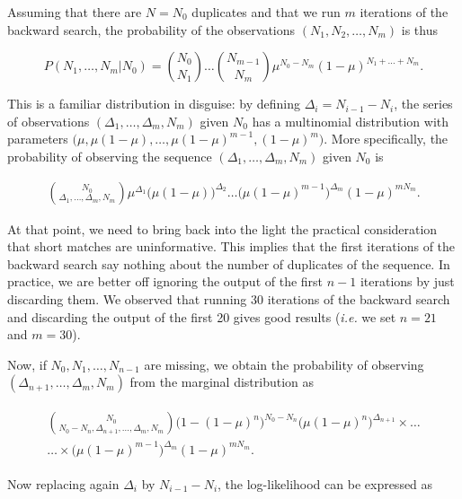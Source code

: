 \documentclass{article}
\begin{document}
Assuming that there are $N = N_0$ duplicates and that we run $m$
iterations of the backward search, the probability of the observations
$(N_1, N_2, \ldots, N_m)$ is thus

\begin{equation*}
P(N_1, \ldots, N_m|N_0) = 
{N_0 \choose N_1 } \ldots {N_{m-1} \choose N_m }
\mu^{N_0-N_m}(1-\mu)^{N_1+\ldots+N_m}.
\end{equation*}

This is a familiar distribution in disguise: by defining $\Delta_i =
N_{i-1} - N_i$, the series of observations $(\Delta_1, \ldots, \Delta_m,
N_m)$ given $N_0$ has a multinomial distribution with parameters
$\big(\mu, \mu(1-\mu), \ldots, \mu(1-\mu)^{m-1}, (1-\mu)^m\big)$. More
specifically, the probability of observing the sequence $(\Delta_1,
\ldots, \Delta_m, N_m)$ given $N_0$ is

\begin{align*}
{N_0 \choose \Delta_1, \ldots, \Delta_m, N_m}
\mu^{\Delta_1}\big(\mu(1-\mu)\big)^{\Delta_2}
\ldots \big(\mu(1-\mu)^{m-1}\big)^{\Delta_m}(1-\mu)^{mN_m}.
\end{align*}

At that point, we need to bring back into the light the practical
consideration that short matches are uninformative. This implies that the
first iterations of the backward search say nothing about the number of
duplicates of the sequence. In practice, we are better off ignoring the
output of the first $n-1$ iterations by just discarding them. We observed
that running 30 iterations of the backward search and discarding the
output of the first 20 gives good results (\textit{i.e.} we set $n = 21$
and $m=30$).

Now, if $N_0, N_1, \ldots, N_{n-1}$ are missing, we obtain the probability
of observing $(\Delta_{n+1}, \ldots, \Delta_m, N_m)$ from the marginal
distribution as

\begin{align*}
\begin{split}
{N_0 \choose N_0-N_n, \Delta_{n+1}, \ldots, \Delta_m, N_m}
\big(1-(1-\mu)^n\big)^{N_0-N_n}
\big(\mu(1-\mu)^n\big)^{\Delta_{n+1}} \times
\ldots \\
\ldots \times
\big(\mu(1-\mu)^{m-1}\big)^{\Delta_m}(1-\mu)^{mN_m}.
\end{split}
\end{align*}

Now replacing again $\Delta_i$ by $N_{i-1}-N_i$, the log-likelihood can be
expressed as
\end{document}
